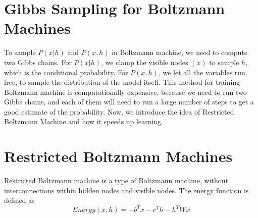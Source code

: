 \documentclass[11pt,fleqn, UTF8]{ctexbook} %
\begin{document}
\section{Gibbs Sampling for Boltzmann Machines}
To sample $P(x\vert h)$ and $P(x,h)$ in Boltzmann machine, we need to compute two Gibbs chains. For $P(x\vert h)$, we clamp the visible nodes $(x)$ to sample $h$, which is the conditional probability. For $P(x,h)$, we let all the variables run free, to sample the distribution of the model itself. This method for training Boltzmann machine is computationally expensive, because we need to run two Gibbs chains, and each of them will need to run a large number of steps to get a good estimate of the probability. Now, we introduce the idea of Restricted Boltzmann Machine and how it speeds up learning.
\section{Restricted Boltzmann Machines}
Restricted Boltzmann machine is a type of Boltzmann machine, without interconnections within hidden nodes and visible nodes. The energy function is defined as
\begin{equation*}
  Energy(x,h)=-{b}^Tx-{c}^Th-{h}^TWx
\end{equation*}
\end{document}
